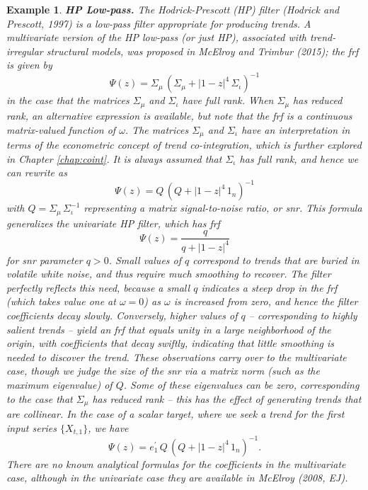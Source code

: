\documentclass[a4paper]{book}
\newtheorem{Example}{Example}
\begin{document}
\begin{Example} {\bf HP Low-pass.} \rm
\label{exam:hp-low}
 The Hodrick-Prescott (HP) filter (Hodrick
and Prescott, 1997) is a low-pass filter appropriate for producing trends.
 A multivariate version of the HP low-pass (or just HP), 
 associated with trend-irregular structural models,
 was proposed in McElroy and Trimbur (2015); the frf is given by
\[
   \Psi (z) = \Sigma_{\mu} \, { \left( \Sigma_{\mu} + {|1 - z|}^4 \, \Sigma_{\iota} 
	\right) }^{-1}
\]
 in the case that the matrices $\Sigma_{\mu}$ and $\Sigma_{\iota}$ have full rank.  
  When $\Sigma_{\mu}$ has reduced rank, an alternative expression is available,
 but note that the frf is a continuous matrix-valued function of $\omega$.
The matrices $\Sigma_{\mu}$ and $\Sigma_{\iota}$ have an interpretation in terms
 of the econometric concept of trend co-integration, which is further explored
 in Chapter \ref{chap:coint}.  It is always assumed that $\Sigma_{\iota}$ has full rank, 
 and hence  we can rewrite as
\[
  \Psi (z) = Q \, { \left( Q + {| 1 - z|}^4 \, 1_n \right) }^{-1}
\]
 with $Q = \Sigma_{\mu} \, \Sigma_{\iota}^{-1}$ representing a matrix
 {\em signal-to-noise ratio}, or snr.  This formula 
  generalizes the univariate HP filter, which has frf
\[
 \Psi (z) = \frac{ q}{ q + {| 1 - z|}^4 }
\]
 for snr parameter $q > 0$.  Small values of $q$ correspond to trends that are
 buried in volatile white noise, and thus require much smoothing to recover.
 The filter perfectly reflects this need, because a small $q$ indicates a steep
 drop in the frf (which takes value one at $\omega = 0$) as $\omega$ is increased
 from zero, and hence the filter coefficients decay slowly.  Conversely, higher values
 of $q$ -- corresponding to highly salient trends -- yield an frf that equals unity
 in a large neighborhood of the origin, with coefficients that decay swiftly,
 indicating that little smoothing is needed to discover the trend.  These observations
 carry over to the multivariate case, though we judge the size of the snr via a
 matrix norm (such as the maximum eigenvalue) of $Q$.  Some of these eigenvalues can be
 zero, corresponding to the case that $\Sigma_{\mu}$ has reduced rank -- this has the
 effect of generating trends that are collinear.  In the case of a scalar target,
 where we seek a trend for the first input series $\{ X_{t,1} \}$,  we have 
\begin{equation}
\label{eq:hp.mvar-def}
  \Psi (z) = e_1^{\prime} \, Q \, { \left( Q + {| 1 - z|}^4 \, 1_n \right) }^{-1}.
\end{equation}
 There are no known analytical formulas for the coefficients in the multivariate case,
 although in the univariate case they are available in McElroy (2008, EJ).
\end{Example}
\end{document}
